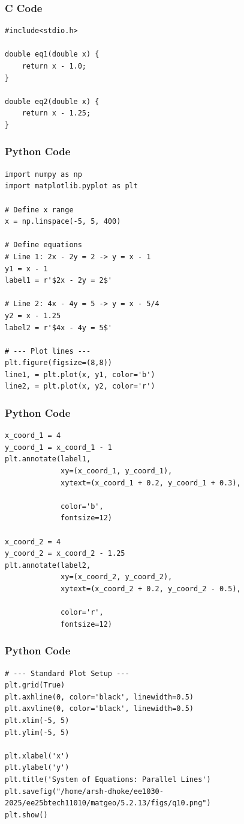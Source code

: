 \documentclass{beamer}
\begin{document}
\begin{frame}[fragile]
    \frametitle{C Code}
\begin{lstlisting}
#include<stdio.h>

double eq1(double x) {
    return x - 1.0;
}

double eq2(double x) {
    return x - 1.25;
}
\end{lstlisting}
\end{frame}

\begin{frame}[fragile]
    \frametitle{Python Code}
\begin{lstlisting}
import numpy as np
import matplotlib.pyplot as plt

# Define x range
x = np.linspace(-5, 5, 400)

# Define equations
# Line 1: 2x - 2y = 2 -> y = x - 1
y1 = x - 1
label1 = r'$2x - 2y = 2$'

# Line 2: 4x - 4y = 5 -> y = x - 5/4
y2 = x - 1.25
label2 = r'$4x - 4y = 5$'

# --- Plot lines ---
plt.figure(figsize=(8,8))
line1, = plt.plot(x, y1, color='b')
line2, = plt.plot(x, y2, color='r')
\end{lstlisting}
\end{frame}

\begin{frame}[fragile]
    \frametitle{Python Code}
\begin{lstlisting}
x_coord_1 = 4
y_coord_1 = x_coord_1 - 1
plt.annotate(label1, 
             xy=(x_coord_1, y_coord_1), 
             xytext=(x_coord_1 + 0.2, y_coord_1 + 0.3),
            
             color='b',
             fontsize=12)

x_coord_2 = 4
y_coord_2 = x_coord_2 - 1.25
plt.annotate(label2, 
             xy=(x_coord_2, y_coord_2), 
             xytext=(x_coord_2 + 0.2, y_coord_2 - 0.5), 
             
             color='r',
             fontsize=12)
\end{lstlisting}
\end{frame}


\begin{frame}[fragile]
    \frametitle{Python Code}
\begin{lstlisting}
# --- Standard Plot Setup ---
plt.grid(True)
plt.axhline(0, color='black', linewidth=0.5)
plt.axvline(0, color='black', linewidth=0.5)
plt.xlim(-5, 5)
plt.ylim(-5, 5)

plt.xlabel('x')
plt.ylabel('y')
plt.title('System of Equations: Parallel Lines')
plt.savefig("/home/arsh-dhoke/ee1030-2025/ee25btech11010/matgeo/5.2.13/figs/q10.png")
plt.show()
\end{lstlisting}
\end{frame}
\end{document}

